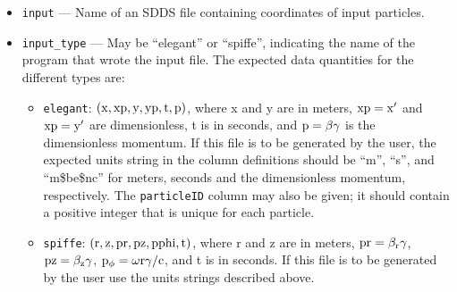 \documentclass[11pt]{article}
\begin{document}
\begin{itemize}
\item \verb|input| --- Name of an  SDDS file containing coordinates of input particles.
\item \verb|input_type| --- May be ``elegant'' or ``spiffe'', indicating the name of the
program that wrote the input file.  The expected data quantities for the different types are:
\begin{itemize}
\item {\tt elegant}: ${\rm (x, xp, y, yp, t, p)}$, where x and y are
in meters, ${\rm xp=x^\prime}$ and ${\rm xp=y^\prime}$ are
dimensionless, t is in seconds, and ${\rm p=\beta\gamma}$ is the
dimensionless momentum. If this file is to be generated by the user,
the expected units string in the column definitions should be ``m'',
``s'', and ``m\$be\$nc'' for meters, seconds and the dimensionless
momentum, respectively.
The \verb|particleID| column may also be given; it should contain a positive integer that is unique for
each particle.

\item {\tt spiffe}: ${\rm (r, z, pr, pz, pphi, t)}$, where r and z are
in meters, ${\rm pr=\beta_r \gamma}$, ${\rm pz = \beta_z \gamma}$,
${\rm p_\phi = \omega r \gamma/c}$, and t is in seconds. If this file
is to be generated by the user use the units strings described above.
\end{itemize}


\end{itemize}
\end{document}
